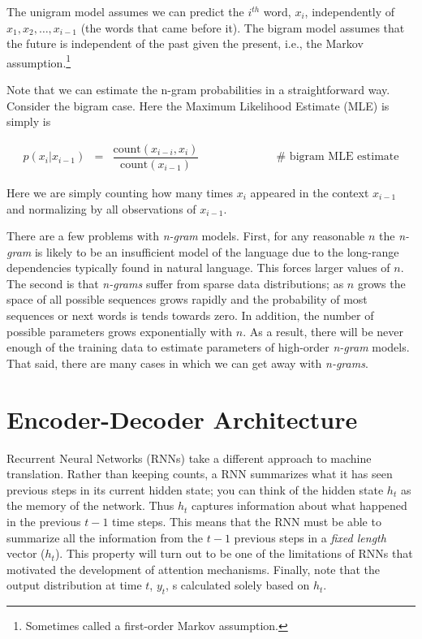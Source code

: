 \documentclass[11pt, oneside]{article}
\theoremstyle{definition}
\begin{document}
\bigskip
\noindent
The unigram model assumes we can predict the $i^{th}$ word, 
$x_i$, independently of $x_1,x_2,\hdots,x_{i-1}$ (the words 
that came before it). The bigram model assumes that the 
future is independent of the past given the present, 
i.e., the Markov assumption.\footnote{Sometimes called a 
first-order Markov assumption.}

\bigskip
\noindent
Note that we can estimate the n-gram probabilities in a
straightforward way. Consider the bigram case. Here the
Maximum Likelihood Estimate (MLE) is simply is


\begin{equation*}
\begin{array}{llll}
p(x_{i} |x_{i-1}) 
	&=& \dfrac{\text{count}(x_{i-i}, x_{i})}{\text{count}(x_{i-1})}
    &\qquad \qquad \qquad \mathbin{\#} \text{ bigram MLE estimate}
\end{array}
\end{equation*}

\bigskip
\noindent
Here we are simply counting how many times $x_{i}$ appeared in
the context $x_{i-1}$ and normalizing by all observations of
$x_{i-1}$. 

\bigskip
\noindent
There are a few problems with \emph{n-gram} models. First, for
any reasonable $n$ the \emph{n-gram} is likely to be an
insufficient model of the language due to the long-range dependencies
typically found in natural language.  This forces larger values
of $n$. The second is that \emph{n-grams} suffer from sparse data
distributions; as $n$ grows the space of all possible sequences
grows rapidly and the probability of most sequences or next words
is tends towards zero. In addition, the number of possible
parameters grows exponentially with $n$. As a result, there will
be never enough of the training data to estimate parameters of
high-order \emph{n-gram} models. That said, there are many cases
in which we can get away with \emph{n-grams}.

\section{Encoder-Decoder Architecture}
\noindent
Recurrent Neural Networks (RNNs) take a different approach to
machine translation. Rather than keeping counts, a RNN summarizes
what it has seen previous steps in its current hidden state; you
can think of the hidden state $h_t$ as the memory of the
network. Thus $h_t$ captures information about what happened in
the previous $t-1$ time steps. This means that the RNN must be
able to summarize all the information from the $t-1$ previous
steps in a \emph{fixed length} vector ($h_t$). This property will
turn out to be one of the limitations of RNNs that motivated the
development of attention mechanisms. Finally, note that the
output distribution at time $t$, $y_t$, s calculated solely based
on $h_t$.
\end{document}
